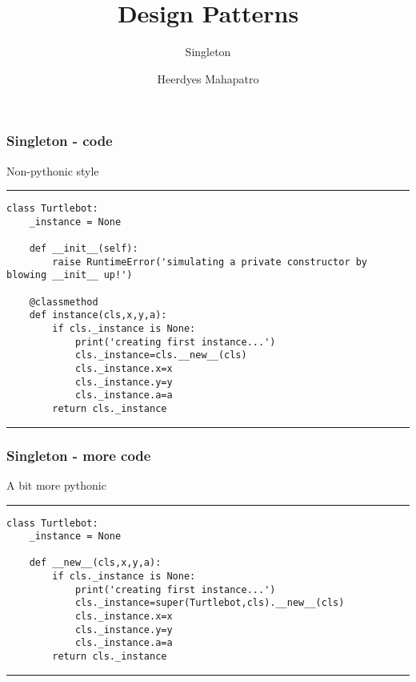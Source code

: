 \documentclass{beamer}
\title{Design Patterns}
\subtitle{Singleton}
\author{Heerdyes Mahapatro}
\begin{document}
	\frame {
		\titlepage
	}
	\begin{frame}[fragile]
	    \frametitle{Singleton - code}
	    Non-pythonic style
	    \rule{\textwidth}{1pt}
	    \scriptsize
	    \begin{verbatim}
class Turtlebot:
    _instance = None
    
    def __init__(self):
        raise RuntimeError('simulating a private constructor by blowing __init__ up!')
        
    @classmethod
    def instance(cls,x,y,a):
        if cls._instance is None:
            print('creating first instance...')
            cls._instance=cls.__new__(cls)
            cls._instance.x=x
            cls._instance.y=y
            cls._instance.a=a
        return cls._instance
	    \end{verbatim}
	    \rule{\textwidth}{1pt}
	\end{frame}
	\begin{frame}[fragile]
	    \frametitle{Singleton - more code}
	    A bit more pythonic \cite{pypatterns}
	    \rule{\textwidth}{1pt}
	    \scriptsize
	    \begin{verbatim}
class Turtlebot:
    _instance = None
    
    def __new__(cls,x,y,a):
        if cls._instance is None:
            print('creating first instance...')
            cls._instance=super(Turtlebot,cls).__new__(cls)
            cls._instance.x=x
            cls._instance.y=y
            cls._instance.a=a
        return cls._instance
	    \end{verbatim}
	    \rule{\textwidth}{1pt}
	\end{frame}
\end{document}
